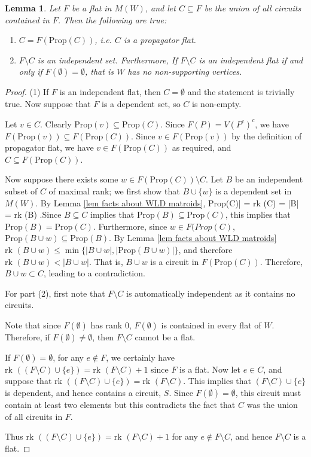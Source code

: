 \documentclass[11pt]{article}
\newcommand{\rk}{\textrm{rk }}
\def\bas #1\eas{\begin{align*} #1 \end{align*}}
\newcommand{\Prop}{\textrm{Prop}}
\newtheorem{lem}[thm]{Lemma}
\theoremstyle{remark}
\theoremstyle{definition}
\begin{document}
\begin{lem} \label{lem decompose flat}Let $F$ be a flat in $M(W)$, and let $C \subseteq F$ be the union of all circuits contained in $F$. Then the following are true:
\begin{enumerate}
\item $C = F(\Prop (C))$, i.e. $C$ is a propagator flat.
\item $F \setminus C$ is an independent set. Furthermore, If $F\setminus C$ is an independent flat if and only if $F(\emptyset) = \emptyset$, that is $W$ has no non-supporting vertices.  
\end{enumerate}
\end{lem}

\begin{proof}
(1) If $F$ is an independent flat, then $C = \emptyset$ and the statement is trivially true. Now suppose that $F$ is a dependent set, so $C$ is non-empty.

Let $v \in C$. Clearly $\Prop(v) \subseteq \Prop(C)$. Since $F(P)  = V(P^c)^c$, we have $F(\Prop(v)) \subseteq F(\Prop(C))$. Since $v \in F(\Prop(v))$ by the definition of propagator flat, we have $v \in F(\Prop(C))$ as required, and $C \subseteq F(\Prop(C))$. 

Now suppose there exists some $w \in  F(\Prop(C)) \setminus C$. Let $B$ be an independent subset of $C$ of maximal rank; we first show that $B \cup \{w\}$ is a dependent set in $M(W)$. By Lemma \ref{lem facts about WLD matroids}, \bas |\Prop(C)| = \rk(C) = |B| = \rk(B) .\eas Since $B \subseteq C$ implies that  $\Prop(B) \subseteq \Prop(C)$, this implies that $\Prop(B) = \Prop(C)$. Furthermore, since $w \in F(Prop(C)$, $\Prop(B\cup w) \subseteq \Prop(B)$. By Lemma \ref{lem facts about WLD matroids} $\rk (B \cup w) \leq \min\{|B\cup w|, |\Prop(B\cup w)|\}$, and therefore $\rk (B \cup w) < |B\cup w|$. That is, $B\cup w$ is a circuit in $F(\Prop(C))$. Therefore, $B \cup w \subset C$, leading to a contradiction.


For part (2), first note that $F \setminus C$ is automatically independent as it contains no circuits.

Note that since $F(\emptyset)$ has rank $0$, $F(\emptyset)$ is contained in every flat of $W$. Therefore, if $F(\emptyset) \neq \emptyset$, then $F\setminus C$ cannot be a flat. 

If $F(\emptyset) = \emptyset$, for any $e \not\in F$, we certainly have $\rk((F\setminus C)\cup\{e\}) = \rk(F\setminus C) +1$ since $F$ is a flat. Now let $e \in C$, and suppose that $\rk((F\setminus C)\cup\{e\}) = \rk(F\setminus C)$. This implies that $(F\setminus C)\cup \{e\}$ is dependent, and hence contains a circuit, $S$. Since $F(\emptyset) = \emptyset$, this circuit must contain at least two elements but this contradicts the fact that $C$ was the union of all circuits in $F$. 

Thus $\rk((F\setminus C)\cup \{e\}) = \rk(F\setminus C) + 1$ for any $e \not\in F\setminus C$, and hence $F\setminus C$ is a flat.
\end{proof}
\end{document}
